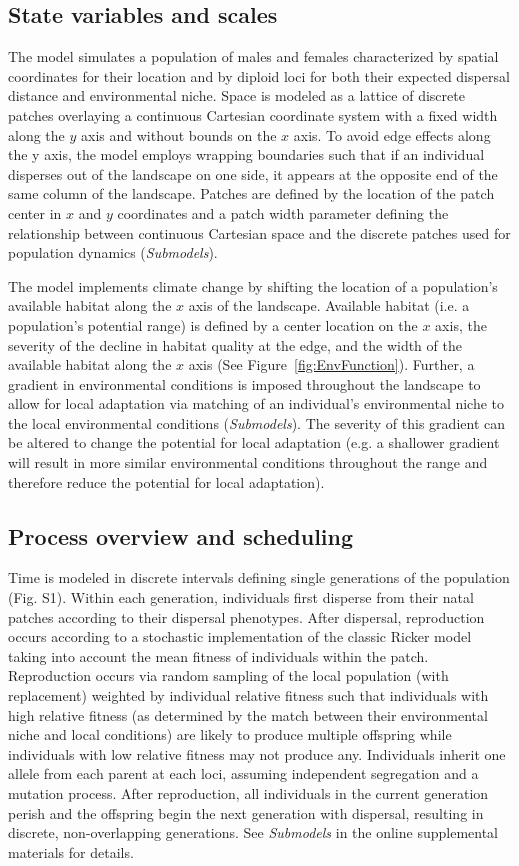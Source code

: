 \documentclass[12pt, oneside]{article}
\begin{document}
\subsection*{State variables and scales} 
The model simulates a population of males and females characterized by spatial coordinates for their location and by diploid loci for both their expected dispersal distance and environmental niche. Space is modeled as a lattice of discrete patches overlaying a continuous Cartesian coordinate system with a fixed width along the $y$ axis and without bounds on the $x$ axis. To avoid edge effects along the y axis, the model employs wrapping boundaries such that if an individual disperses out of the landscape on one side, it appears at the opposite end of the same column of the landscape. Patches are defined by the location of the patch center in $x$ and $y$ coordinates and a patch width parameter defining the relationship between continuous Cartesian space and the discrete patches used for population dynamics (\textit{Submodels}). 

The model implements climate change by shifting the location of a population's available habitat along the $x$ axis of the landscape. Available habitat (i.e. a population's potential range) is defined by a center location on the $x$ axis, the severity of the decline in habitat quality at the edge, and the width of the available habitat along the $x$ axis (See Figure~\ref{fig:EnvFunction}). Further, a gradient in environmental conditions is imposed throughout the landscape to allow for local adaptation via matching of an individual's environmental niche to the local environmental conditions (\textit{Submodels}). The severity of this gradient can be altered to change the potential for local adaptation (e.g. a shallower gradient will result in more similar environmental conditions throughout the range and therefore reduce the potential for local adaptation).

\subsection*{Process overview and scheduling} 
Time is modeled in discrete intervals defining single generations of the population (Fig. S1). Within each generation, individuals first disperse from their natal patches according to their dispersal phenotypes. After dispersal, reproduction occurs according to a stochastic implementation of the classic Ricker model~\citep{ricker1954stock} taking into account the mean fitness of individuals within the patch. Reproduction occurs via random sampling of the local population (with replacement) weighted by individual relative fitness such that individuals with high relative fitness (as determined by the match between their environmental niche and local conditions) are likely to produce multiple offspring while individuals with low relative fitness may not produce any. Individuals inherit one allele from each parent at each loci, assuming independent segregation and a mutation process. After reproduction, all individuals in the current generation perish and the offspring begin the next generation with dispersal, resulting in discrete, non-overlapping generations. See \textit{Submodels} in the online supplemental materials for details. 
\end{document}
